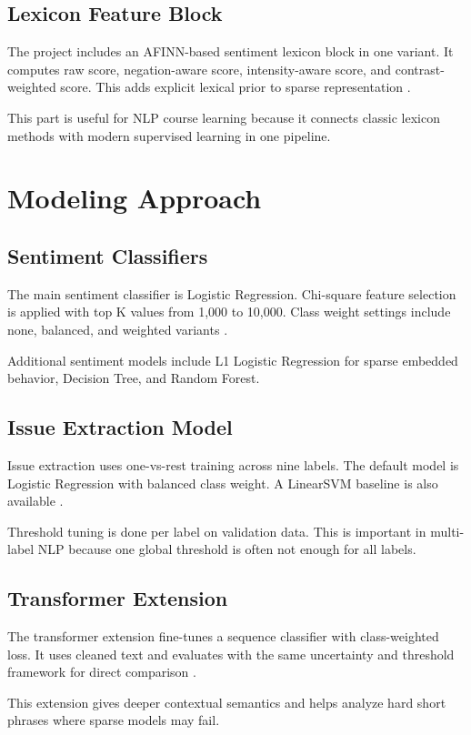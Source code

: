\documentclass[12pt,a4paper]{article}
\begin{document}
\subsection{Lexicon Feature Block}
The project includes an AFINN-based sentiment lexicon block in one variant. It computes raw score, negation-aware score, intensity-aware score, and contrast-weighted score. This adds explicit lexical prior to sparse representation \cite{nielsen2011}.

This part is useful for NLP course learning because it connects classic lexicon methods with modern supervised learning in one pipeline.

\section{Modeling Approach}
\subsection{Sentiment Classifiers}
The main sentiment classifier is Logistic Regression. Chi-square feature selection is applied with top K values from 1,000 to 10,000. Class weight settings include none, balanced, and weighted variants \cite{forman2003}.

Additional sentiment models include L1 Logistic Regression for sparse embedded behavior, Decision Tree, and Random Forest.

\subsection{Issue Extraction Model}
Issue extraction uses one-vs-rest training across nine labels. The default model is Logistic Regression with balanced class weight. A LinearSVM baseline is also available \cite{rifkin2004}.

Threshold tuning is done per label on validation data. This is important in multi-label NLP because one global threshold is often not enough for all labels.

\subsection{Transformer Extension}
The transformer extension fine-tunes a sequence classifier with class-weighted loss. It uses cleaned text and evaluates with the same uncertainty and threshold framework for direct comparison \cite{devlin2019}.

This extension gives deeper contextual semantics and helps analyze hard short phrases where sparse models may fail.
\end{document}
